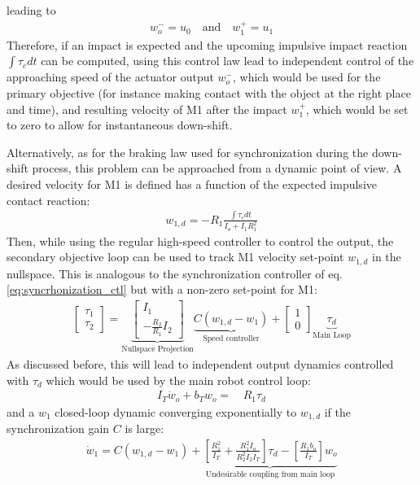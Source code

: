 %
leading to
%
\begin{align}
 w_o^- = u_0 \quad \text{and} \quad w_1^+ = u_1
\end{align}
%
Therefore, if an impact is expected and the upcoming impulsive impact reaction $\int{\tau_c dt}$ can be computed, using this control law lead to independent control of the approaching speed of the actuator output $w_o^-$, which would be used for the primary objective (for instance making contact with the object at the right place and time), and resulting velocity of M1 after the impact $w_1^+$, which would be set to zero to allow for instantaneous down-shift.

%
Alternatively, as for the braking law used for synchronization during the down-shift process, this problem can be approached from a dynamic point of view. A desired velocity for M1 is defined has a function of the expected impulsive contact reaction:
%
\begin{align}
w_{1,d}  = - R_1 \frac{\int{\tau_c dt}}{I_o + I_1 R_1^2}
\label{eq:dsdm_impact_gen_delta_w1}
\end{align}
%
Then, while using the regular high-speed controller to control the output, the secondary objective loop can be used to track M1 velocity set-point $w_{1,d}$ in the nullspace. This is analogous to the synchronization controller of eq. \eqref{eq:syncrhonization_ctl} but with a non-zero set-point for M1:
%
\begin{align}
\left[ \begin{array}{c}
\tau_1 \\
\tau_2
\end{array} \right]
 = 
\underbrace{\left[ \begin{array}{c}
I_1 \\
-\frac{R_2 }{R_1} I_2 
\end{array} \right]}_{\text{Nullspace Projection}} \underbrace{C (w_{1,d} -  w_1)}_{\text{Speed controller}} + 
\left[ \begin{array}{c}
1 \\
0 
\end{array} \right]  \underbrace{ \tau_d }_{\text{Main Loop}}
\end{align}
%
As discussed before, this will lead to independent output dynamics controlled with $\tau_d$ which would be used by the main robot control loop:
\begin{align}
I_T \dot{w}_o +
b_T  w_o
=& \, R_1 \tau_d  
\end{align}
and a $w_1$ closed-loop dynamic converging exponentially to $w_{1,d}$ if the synchronization gain $C$ is large:
\begin{align}
 \dot{w}_1 = C \left( w_{1,d} - w_1 \right) + \underbrace{\left[\frac{R_1^2}{I_T} + \frac{R_1^2 I_o}{R_2^2 I_2 I_T} \right] \tau_d - \left[\frac{R_1 b_o}{I_T}\right] w_o }_{\text{Undesirable coupling from main loop}}
\end{align}

